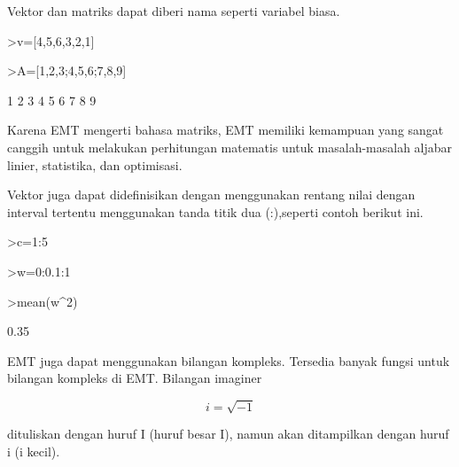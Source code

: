 \documentclass[a4paper,10pt]{article}
\begin{document}
\begin{eulernotebook}
\begin{eulercomment}
\begin{eulercomment}
\begin{eulercomment}
Vektor dan matriks dapat diberi nama seperti variabel biasa.
\end{eulercomment}
\begin{eulerprompt}
>v=[4,5,6,3,2,1]
\end{eulerprompt}
\begin{euleroutput}
  [4,  5,  6,  3,  2,  1]
\end{euleroutput}
\begin{eulerprompt}
>A=[1,2,3;4,5,6;7,8,9]
\end{eulerprompt}
\begin{euleroutput}
              1             2             3 
              4             5             6 
              7             8             9 
\end{euleroutput}
\begin{eulercomment}
Karena EMT mengerti bahasa matriks, EMT memiliki kemampuan yang sangat canggih
untuk melakukan perhitungan matematis untuk masalah-masalah aljabar linier,
statistika, dan optimisasi.

Vektor juga dapat didefinisikan dengan menggunakan rentang nilai dengan interval
tertentu menggunakan tanda titik dua (:),seperti contoh berikut ini.
\end{eulercomment}
\begin{eulerprompt}
>c=1:5
\end{eulerprompt}
\begin{euleroutput}
  [1,  2,  3,  4,  5]
\end{euleroutput}
\begin{eulerprompt}
>w=0:0.1:1
\end{eulerprompt}
\begin{euleroutput}
  [0,  0.1,  0.2,  0.3,  0.4,  0.5,  0.6,  0.7,  0.8,  0.9,  1]
\end{euleroutput}
\begin{eulerprompt}
>mean(w^2)
\end{eulerprompt}
\begin{euleroutput}
  0.35
\end{euleroutput}
\begin{eulercomment}
EMT juga dapat menggunakan bilangan kompleks. Tersedia banyak fungsi
untuk bilangan kompleks di EMT. Bilangan imaginer

\end{eulercomment}
\begin{eulerformula}
\[
i = \sqrt{-1}
\]
\end{eulerformula}
\begin{eulercomment}
dituliskan dengan huruf I (huruf besar I), namun akan ditampilkan
dengan huruf i (i kecil).


\end{eulercomment}
\end{eulercomment}
\end{eulercomment}
\end{eulernotebook}
\end{document}
